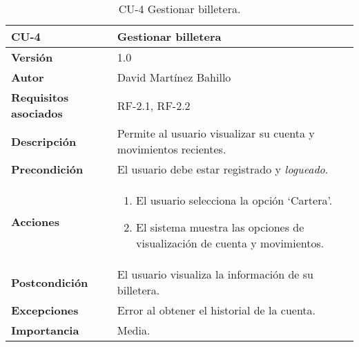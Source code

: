 \begin{table}[p]
	\centering
	\begin{tabularx}{\linewidth}{ p{} p{} }
		\toprule
		\textbf{CU-4}    & \textbf{Gestionar billetera}\\
		\midrule
		\textbf{Versión}              & 1.0    \\
		\textbf{Autor}                & David Martínez Bahillo \\
		\textbf{Requisitos asociados} & RF-2.1, RF-2.2 \\
		\textbf{Descripción}          & Permite al usuario visualizar su cuenta y movimientos recientes. \\
		\textbf{Precondición}         &  El usuario debe estar registrado y \textit{logueado}. \\
		\textbf{Acciones}             &
		\begin{enumerate}
			\def\labelenumi{\arabic{enumi}.}
			\tightlist
			\item El usuario selecciona la opción `Cartera'.
			\item El sistema muestra las opciones de visualización de cuenta y movimientos.
		\end{enumerate}\\
		\textbf{Postcondición}        & El usuario visualiza la información de su billetera. \\
		\textbf{Excepciones}          & Error al obtener el historial de la cuenta. \\
		\textbf{Importancia}          & Media.  \\
		\bottomrule
	\end{tabularx}
	\caption{CU-4 Gestionar billetera.}
\end{table}


